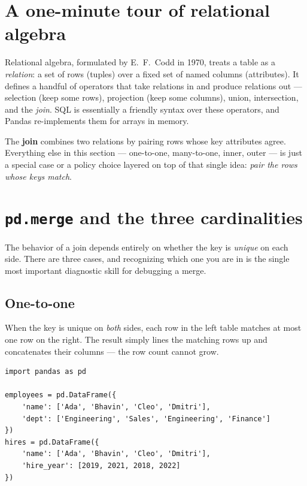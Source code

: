 \documentclass[11pt]{article}
\begin{document}
\section{A one-minute tour of relational algebra}

\begin{background}
Relational algebra, formulated by E.\ F.\ Codd in 1970, treats a table as a \emph{relation}: a set of rows (tuples) over a fixed set of named columns (attributes). It defines a handful of operators that take relations in and produce relations out --- selection (keep some rows), projection (keep some columns), union, intersection, and the \emph{join}. SQL is essentially a friendly syntax over these operators, and Pandas re-implements them for arrays in memory.

The \textbf{join} combines two relations by pairing rows whose key attributes agree. Everything else in this section --- one-to-one, many-to-one, inner, outer --- is just a special case or a policy choice layered on top of that single idea: \emph{pair the rows whose keys match}.
\end{background}

\section{\texttt{pd.merge} and the three cardinalities}

The behavior of a join depends entirely on whether the key is \emph{unique} on each side. There are three cases, and recognizing which one you are in is the single most important diagnostic skill for debugging a merge.

\subsection{One-to-one}

When the key is unique on \emph{both} sides, each row in the left table matches at most one row on the right. The result simply lines the matching rows up and concatenates their columns --- the row count cannot grow.

\begin{lstlisting}
import pandas as pd

employees = pd.DataFrame({
    'name': ['Ada', 'Bhavin', 'Cleo', 'Dmitri'],
    'dept': ['Engineering', 'Sales', 'Engineering', 'Finance']
})
hires = pd.DataFrame({
    'name': ['Ada', 'Bhavin', 'Cleo', 'Dmitri'],
    'hire_year': [2019, 2021, 2018, 2022]
})
\end{lstlisting}
\end{document}
